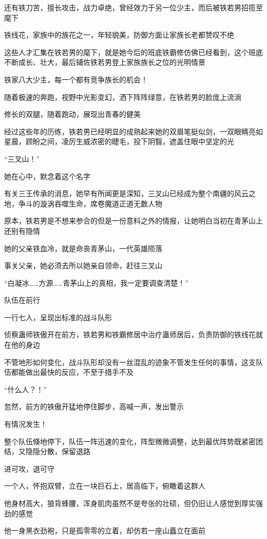 \begin{this_body}
还有铁刀苦，擅长攻击，战力卓绝，曾经效力于另一位少主，而后被铁若男招揽至麾下

铁线花，家族中的族花之一，年轻貌美，防御方面让家族长老都赞叹不绝

这些人才汇集在铁若男的麾下，就是她今后的班底铁霸修仿佛已经看到，这个班底不断成长、壮大，最后辅佐铁若男登上家族族长之位的光明情景

铁家八大少主，每一个都有竞争族长的机会！

随着极速的奔跑，视野中光影变幻，洒下阵阵绿意，在铁若男的脸庞上流淌

修长的双腿，随着跑动，展现出青春的健美

经过这些年的历练，铁若男已经明显的成熟起来她的双眉笔挺似剑，一双眼睛亮如星晨，顾盼之间，凌厉生威浓密的睫毛，投下阴翳，遮盖住眼中坚定的光

“三叉山！”

她在心中，默念着这个名字

有关三王传承的消息，她早有所闻更是深知，三叉山已经成为整个南疆的风云之地，争斗的漩涡吞噬生命，席卷魔道正道无数人物

原本，铁若男是不想来参合的但是一份意料之外的情报，让她明白当初在青茅山上还别有隐情

她的父亲铁血冷，就是命丧青茅山，一代英雄陨落

事关父亲，她必须去所以她亲自领命，赶往三叉山

“白凝冰……方源……青茅山上的真相，我一定要调查清楚！”

队伍在前行

一行七人，呈现出标准的战斗队形

侦察蛊师铁傲开在前方，铁若男和铁霸修居中治疗蛊师居后，负责防御的铁线花就在他的身边

不管地形如何变化，战斗队形却没有一丝混乱的迹象不管发生任何的事情，这支队伍都能做出最快的反应，不至于措手不及

“什么人？！”

忽然，前方的铁傲开猛地停住脚步，高喊一声，发出警示

有情况发生！

整个队伍倏地停下，队伍一阵迅速的变化，阵型微微调整，达到最优阵势既紧密团结，又隐隐分散，保留退路

进可攻，退可守

一个人，怀抱双臂，立在一块巨石上，居高临下，俯瞰着这群人

他身材高大，狼背蜂腰，浑身肌肉虽然不是夸张的壮硕，但仍旧让人感觉到厚实强劲的感觉

他一身黑衣劲袍，只是孤零零的立着，却仿若一座山矗立在面前


\end{this_body}
